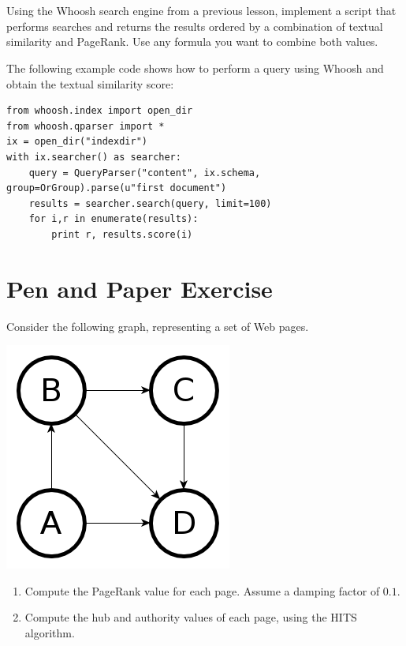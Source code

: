 \documentclass[12pt]{article}
\begin{document}
\section{}

Using the Whoosh search engine from a previous lesson, implement a script that performs
searches and returns the results ordered by a combination of textual similarity
and PageRank. Use any formula you want to combine both values.

The following example code shows how to perform a query using Whoosh and obtain
the textual similarity score:
\begin{verbatim}
from whoosh.index import open_dir
from whoosh.qparser import *
ix = open_dir("indexdir")
with ix.searcher() as searcher:
    query = QueryParser("content", ix.schema, group=OrGroup).parse(u"first document")
    results = searcher.search(query, limit=100)
    for i,r in enumerate(results):
        print r, results.score(i)
\end{verbatim}

\section{Pen and Paper Exercise}

Consider the following graph, representing a set of Web pages.
\begin{center}
    \includegraphics[scale=.5]{graph01}
\end{center}

\begin{enumerate}
\item Compute the PageRank value for each page. Assume a damping factor of
    $0.1$.
\item Compute the hub and authority values of each page, using the HITS algorithm.
\end{enumerate}
\end{document}
